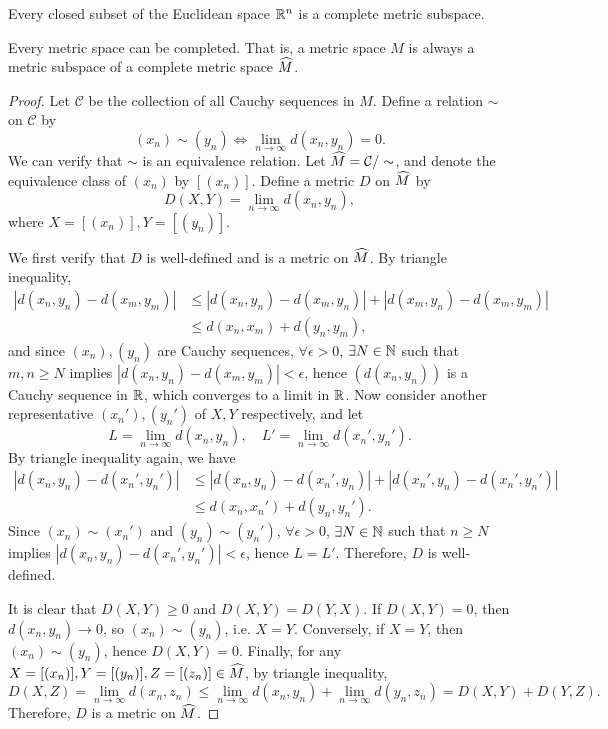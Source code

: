 \begin{cl}
    Every closed subset of the Euclidean space $\R^n$ is a complete metric subspace.
\end{cl}

\begin{thm}
    Every metric space can be completed. That is, a metric space $M$ is always a metric subspace of a complete metric space $\Hat M$.
    \begin{proof}
        Let $\mathcal C$ be the collection of all Cauchy sequences in $M$. Define a relation $\sim$ on $\mathcal C$ by
        \[
        (x_n) \sim (y_n) \iff \lim_{n\to\infty} d(x_n, y_n) = 0.
        \]
        We can verify that $\sim$ is an equivalence relation. Let $\Hat M = \mathcal C/\sim$, and denote the equivalence class of $(x_n)$ by $[(x_n)]$. Define a metric $D$ on $\Hat M$ by
        \[
        D(X, Y) = \lim_{n\to\infty} d(x_n, y_n), 
        \]
        where $X = [(x_n)], Y = [(y_n)]$. 
        
        We first verify that $D$ is well-defined and is a metric on $\Hat M$. By triangle inequality, 
        \begin{align*}
        |d(x_n, y_n) - d(x_m, y_m)| &\leq |d(x_n, y_n) - d(x_m, y_n)| + |d(x_m, y_n) - d(x_m, y_m)| \\
        &\leq d(x_n, x_m) + d(y_n, y_m),
        \end{align*}
        and since $(x_n), (y_n)$ are Cauchy sequences, $\forall \epsilon > 0$, $\exists N\in \N$ such that $m, n \geq N$ implies $|d(x_n, y_n) - d(x_m, y_m)| < \epsilon$, hence $(d(x_n, y_n))$ is a Cauchy sequence in $\R$, which converges to a limit in $\R$. Now consider another representative $(x_n'), (y_n')$ of $X, Y$ respectively, and let
        \[
        L = \lim_{n\to\infty} d(x_n, y_n), \quad L' = \lim_{n\to\infty} d(x_n', y_n').
        \]
        By triangle inequality again, we have
        \begin{align*}
            |d(x_n, y_n) - d(x_n', y_n')| &\leq |d(x_n, y_n) - d(x_n', y_n)| + |d(x_n', y_n) - d(x_n', y_n')| \\
            &\leq d(x_n, x_n') + d(y_n, y_n').
        \end{align*}
        Since $(x_n) \sim (x_n')$ and $(y_n) \sim (y_n')$, $\forall \epsilon > 0$, $\exists N\in \N$ such that $n\geq N$ implies $|d(x_n, y_n) - d(x_n', y_n')| < \epsilon$, hence $L = L'$. Therefore, $D$ is well-defined.

        It is clear that $D(X, Y) \geq 0$ and $D(X, Y) = D(Y, X)$. If $D(X, Y) = 0$, then $d(x_n, y_n) \to 0$, so $(x_n) \sim (y_n)$, i.e. $X = Y$. Conversely, if $X = Y$, then $(x_n) \sim (y_n)$, hence $D(X, Y) = 0$. Finally, for any $X = [(x_n)], Y = [(y_n)], Z = [(z_n)] \in \Hat M$, by triangle inequality,
        \[
        D(X, Z) = \lim_{n\to\infty} d(x_n, z_n) \leq \lim_{n\to\infty} d(x_n, y_n) + \lim_{n\to\infty} d(y_n, z_n) = D(X, Y) + D(Y, Z).
        \]
        Therefore, $D$ is a metric on $\Hat M$.


\end{proof}
\end{thm}
